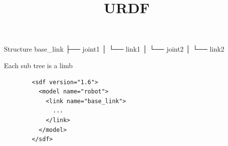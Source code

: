 \documentclass[a4paper]{article}
\title{URDF}
\date{}
\begin{document}
    \maketitle
    Structure
    base\_link
         ├── joint1
         │    └── link1
         │         └── joint2
         │              └── link2
    
    Each sub tree is a limb




    \begin{verbatim}
        <sdf version="1.6">
          <model name="robot">
            <link name="base_link">
              ...
            </link>
          </model>
        </sdf>
        
    \end{verbatim}
\end{document}

